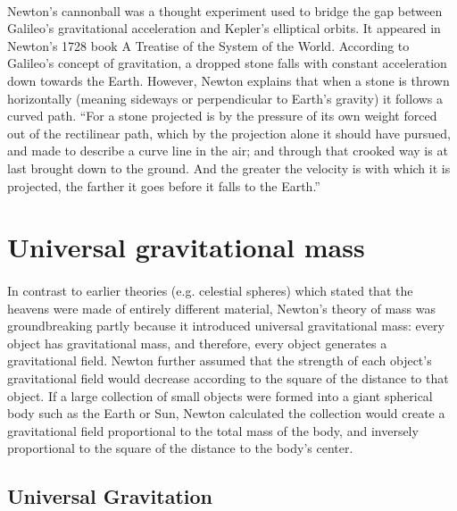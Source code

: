\documentclass{book}
\begin{document}
    \paragraph{}
    Newton's cannonball was a thought experiment used to bridge the gap between Galileo's gravitational acceleration and Kepler's elliptical orbits. It appeared in Newton's 1728 book A Treatise of the System of the World. According to Galileo's concept of gravitation, a dropped stone falls with constant acceleration down towards the Earth. However, Newton explains that when a stone is thrown horizontally (meaning sideways or perpendicular to Earth's gravity) it follows a curved path. ``For a stone projected is by the pressure of its own weight forced out of the rectilinear path, which by the projection alone it should have pursued, and made to describe a curve line in the air; and through that crooked way is at last brought down to the ground. And the greater the velocity is with which it is projected, the farther it goes before it falls to the Earth.''
    
    \section{Universal gravitational mass}
    \paragraph{}
    In contrast to earlier theories (e.g. celestial spheres) which stated that the heavens were made of entirely different material, Newton's theory of mass was groundbreaking partly because it introduced universal gravitational mass: every object has gravitational mass, and therefore, every object generates a gravitational field. Newton further assumed that the strength of each object's gravitational field would decrease according to the square of the distance to that object. If a large collection of small objects were formed into a giant spherical body such as the Earth or Sun, Newton calculated the collection would create a gravitational field proportional to the total mass of the body, and inversely proportional to the square of the distance to the body's center.
    
    \subsection{Universal Gravitation}
\end{document}
